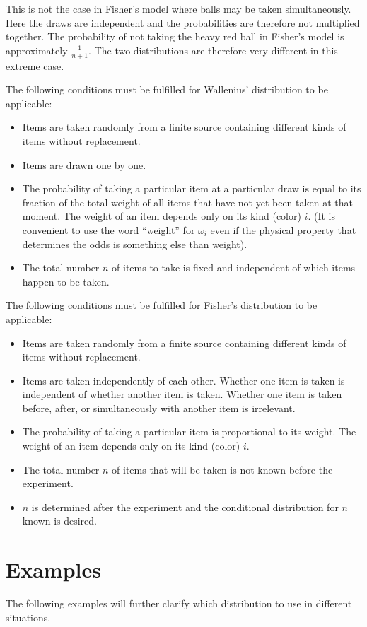 \documentclass[a4paper]{article}
\begin{document}
This is not the case in Fisher's model where balls may be taken 
simultaneously. Here the draws are independent
and the probabilities are therefore not multiplied together. The 
probability of not taking the heavy red ball in Fisher's model is approximately
$\frac{1}{n+1}$. The two distributions are therefore very different
in this extreme case.
\vskip 5mm

The following conditions must be fulfilled for Wallenius' distribution
to be applicable:
%
\begin{itemize}
%
\item Items are taken randomly from a finite source containing different
kinds of items without replacement.
%
\item Items are drawn one by one.
%
\item The probability of taking a particular item at a particular draw is equal
to its fraction of the total weight of all items that have not yet been taken at that
moment. The weight of an item depends only on its kind (color) $i$.
(It is convenient to use the word ``weight'' for $\omega_i$ even if the
physical property that determines the odds is something else than weight).
%
\item The total number $n$ of items to take is fixed and independent of
which items happen to be taken.
%
\end{itemize}
\vskip 5mm

The following conditions must be fulfilled for Fisher's distribution
to be applicable:
%
\begin{itemize}
%
\item Items are taken randomly from a finite source containing different
kinds of items without replacement.
%
\item Items are taken independently of each other. Whether one item is taken
is independent of whether another item is taken. Whether one item is taken
before, after, or simultaneously with another item is irrelevant.
%
\item The probability of taking a particular item is proportional to its weight.
The weight of an item depends only on its kind (color) $i$.
%
\item The total number $n$ of items that will be taken is not known 
before the experiment.
%
\item $n$ is determined after the experiment and the conditional distribution
for $n$ known is desired.
%
\end{itemize}


\section{Examples}
%
The following examples will further clarify which distribution to use in different
situations.
\end{document}
